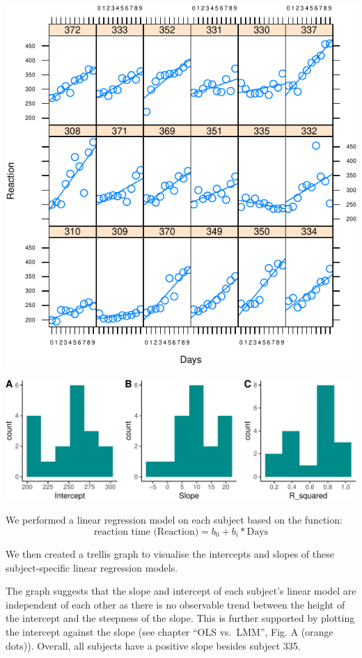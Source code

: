 \documentclass[
]{article}
\begin{document}
\begin{center}\includegraphics{common_sleep_files/figure-latex/trellis-1} \end{center}

\begin{center}\includegraphics{common_sleep_files/figure-latex/unnamed-chunk-3-1.pdf}\end{center}
We performed a linear regression model on each subject based on the function:
\[\text{reaction time (Reaction)} = b_0 + b_i* \text{Days} \tag{1}\]

We then created a trellis graph to visualise the intercepts and slopes
of these subject-specific linear regression models.

The graph suggests that the slope and intercept of each subject's linear
model are independent of each other as there is no observable trend
between the height of the intercept and the steepness of the slope. This
is further supported by plotting the intercept against the slope (see
chapter ``OLS vs.~LMM'', Fig. A (orange dots)). Overall, all subjects
have a positive slope besides subject 335.
\end{document}
